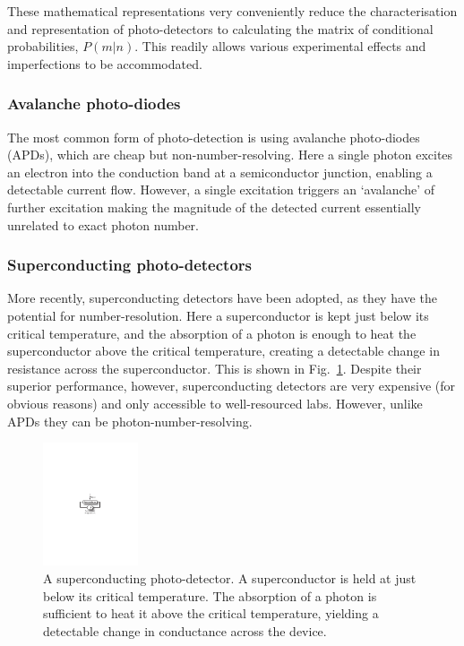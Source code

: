 These mathematical representations very conveniently reduce the characterisation and representation of photo-detectors to calculating the matrix of conditional probabilities, $P(m|n)$. This readily allows various experimental effects and imperfections to be accommodated.

%
%

\subsubsection{Avalanche photo-diodes}

The most common form of photo-detection is using avalanche photo-diodes (APDs), which are cheap but non-number-resolving. Here a single photon excites an electron into the conduction band at a semiconductor junction, enabling a detectable current flow. However, a single excitation triggers an `avalanche' of further excitation making the magnitude of the detected current essentially unrelated to exact photon number.

%
%

\subsubsection{Superconducting photo-detectors}

More recently, superconducting detectors have been adopted, as they have the potential for number-resolution. Here a superconductor is kept just below its critical temperature, and the absorption of a photon is enough to heat the superconductor above the critical temperature, creating a detectable change in resistance across the superconductor. This is shown in Fig.~\ref{fig:super_det}. Despite their superior performance, however, superconducting detectors are very expensive (for obvious reasons) and only accessible to well-resourced labs. However, unlike APDs they can be photon-number-resolving.

\begin{figure}[!htbp]
\includegraphics[width=0.25\textwidth]{superconducting_detector}
\caption{A superconducting photo-detector. A superconductor is held at just below its critical temperature. The absorption of a photon is sufficient to heat it above the critical temperature, yielding a detectable change in conductance across the device.} \label{fig:super_det}
\end{figure}

